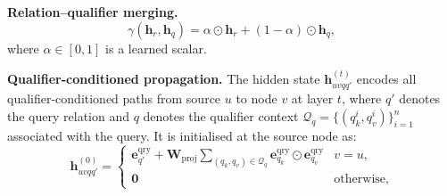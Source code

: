 \documentclass[10pt,journal,compsoc]{IEEEtran}
\begin{document}
\noindent\textbf{Relation--qualifier merging.}
\begin{equation}
  \gamma(\mathbf{h}_r, \mathbf{h}_q)
    = \alpha \odot \mathbf{h}_r
    + (1{-}\alpha) \odot \mathbf{h}_q,
  \label{eq:hr_gamma}
\end{equation}
where $\alpha \in [0,1]$ is a learned scalar.

\noindent\textbf{Qualifier-conditioned propagation.}
The hidden state $\mathbf{h}_{uvqq'}^{(t)}$ encodes
all qualifier-conditioned paths from source $u$ to
node $v$ at layer $t$, where $q'$ denotes the query
relation and $q$ denotes the qualifier context
$\mathcal{Q}_q = \{(q_k^i, q_v^i)\}_{i=1}^n$
associated with the query. It is initialised at the
source node as:
\begin{equation}
  \mathbf{h}_{uvqq'}^{(0)} =
  \begin{cases}
    \mathbf{e}_{q'}^{\mathrm{qry}}
    + \mathbf{W}_{\mathrm{proj}}
    \sum_{(q_k,q_v)\in\mathcal{Q}_q}
    \mathbf{e}_{q_k}^{\mathrm{qry}}
    \odot \mathbf{e}_{q_v}^{\mathrm{qry}}
    & v = u, \\
    \mathbf{0} & \text{otherwise,}
  \end{cases}
  \label{eq:hr_init_inst}
\end{equation}

\end{document}
